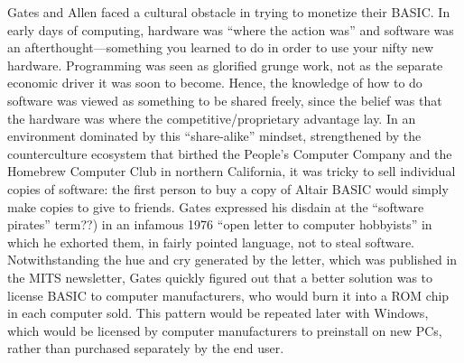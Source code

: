 Gates and Allen faced a cultural obstacle in trying to monetize their
BASIC.
In early days of computing, hardware was ``where the action was'' and
software was an afterthought---something you learned to do in order to
use your nifty new hardware.
Programming was seen as glorified grunge work, not as the separate
economic driver it was soon to become.
Hence, the knowledge of how to do software was viewed as something to be
shared freely, since the belief was that the hardware was where the
competitive/proprietary advantage lay.
In an environment dominated by this ``share-alike'' mindset,
strengthened by the counterculture ecosystem that birthed the People's
Computer Company and the Homebrew Computer Club in northern California,
it was tricky to sell individual copies of software: the first person to
buy a copy of Altair BASIC would simply make copies to give to friends.
Gates expressed his disdain at the ``software pirates'' %
term??)
in an infamous 1976 ``open letter to computer hobbyists'' in which he
exhorted them, in fairly pointed language, not to steal software.
Notwithstanding the hue and cry generated by the letter, which was
published in the MITS newsletter, Gates quickly figured out that a
better solution was to license BASIC to computer manufacturers, who
would burn it into a ROM chip in each computer sold.
This pattern would be repeated later with Windows, which would be
licensed by computer manufacturers to preinstall on new PCs, rather
than purchased separately by the end user.

